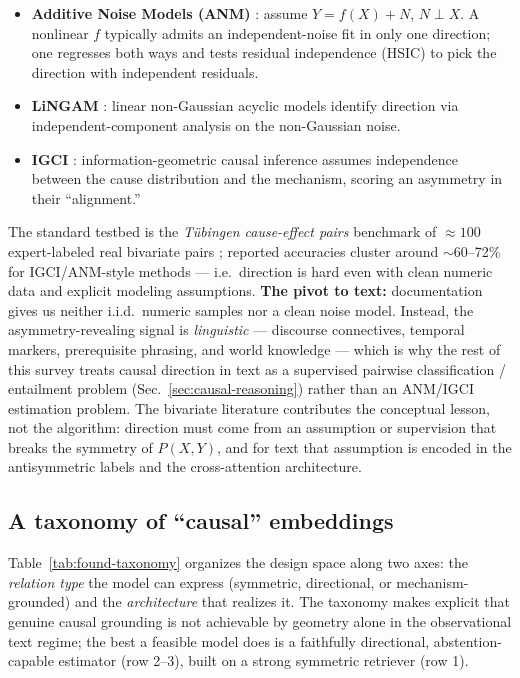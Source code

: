 \begin{itemize}[leftmargin=1.2em,itemsep=2pt]
  \item \textbf{Additive Noise Models (ANM)} \citep{found:hoyer2008anm}:
  assume $Y=f(X)+N$, $N\!\perp\!X$. A nonlinear $f$ typically admits an
  independent-noise fit in only one direction; one regresses both ways and tests
  residual independence (HSIC) to pick the direction with independent residuals.
  \item \textbf{LiNGAM} \citep{found:shimizu2006lingam}: linear non-Gaussian
  acyclic models identify direction via independent-component analysis on the
  non-Gaussian noise.
  \item \textbf{IGCI} \citep{found:janzing2012igci}: information-geometric causal
  inference assumes independence between the cause distribution and the
  mechanism, scoring an asymmetry in their ``alignment.''
\end{itemize}

\noindent The standard testbed is the \emph{T\"ubingen cause-effect pairs}
benchmark of $\approx 100$ expert-labeled real bivariate pairs
\citep{found:mooij2016distinguishing}; reported accuracies cluster around
$\sim$60--72\% for IGCI/ANM-style methods --- i.e.\ direction is hard even with
clean numeric data and explicit modeling assumptions. \textbf{The pivot to
text:} documentation gives us neither i.i.d.\ numeric samples nor a clean noise
model. Instead, the asymmetry-revealing signal is \emph{linguistic} ---
discourse connectives, temporal markers, prerequisite phrasing, and world
knowledge --- which is why the rest of this survey treats causal direction in
text as a supervised pairwise classification / entailment problem
(Sec.~\ref{sec:causal-reasoning}) rather than an ANM/IGCI estimation problem.
The bivariate literature contributes the conceptual lesson, not the algorithm:
direction must come from an assumption or supervision that breaks the symmetry of
$P(X,Y)$, and for text that assumption is encoded in the antisymmetric labels and
the cross-attention architecture.

\subsection{A taxonomy of ``causal'' embeddings}
\label{sec:taxonomy}

Table~\ref{tab:found-taxonomy} organizes the design space along two axes: the
\emph{relation type} the model can express (symmetric, directional, or
mechanism-grounded) and the \emph{architecture} that realizes it. The taxonomy
makes explicit that genuine causal grounding is not achievable by geometry alone
in the observational text regime; the best a feasible model does is a
faithfully directional, abstention-capable estimator (row 2--3), built on a
strong symmetric retriever (row 1).

